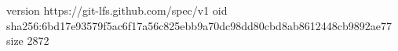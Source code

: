 version https://git-lfs.github.com/spec/v1
oid sha256:6bd17e93579f5ac6f17a56c825ebb9a70dc98dd80cbd8ab8612448cb9892ae77
size 2872
